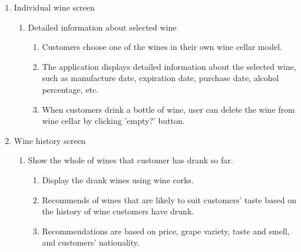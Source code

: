 \documentclass[conference]{IEEEtran}
\numberwithin{figure}{subsection}
\begin{document}
\begin{enumerate}
\item Individual wine screen
\begin{enumerate}
\item Detailed information about selected wine
\begin{enumerate}
    \item Customers choose one of the wines in their own wine
    cellar model.
    \item The application displays detailed information about 	the selected wine, such as manufacture date, expiration 	date, purchase date, alcohol percentage, etc.
    \item When customers drink a bottle of wine, user can delete the wine from wine cellar by clicking 'empty?' button.
\end{enumerate}
\end{enumerate}
\item Wine history screen
\begin{enumerate}
\item Show the whole of wines that customer has drank so far.
\begin{enumerate}
    \item Display the drank wines using wine corks.
    \item Recommends of wines that are likely to suit
	customers’ taste based on the history of wine customers	have drunk.
	\item Recommendations are based on price, grape variety,  
   	taste and smell, and customers’ nationality.
\end{enumerate}
\end{enumerate}
\end{enumerate}
\end{document}
